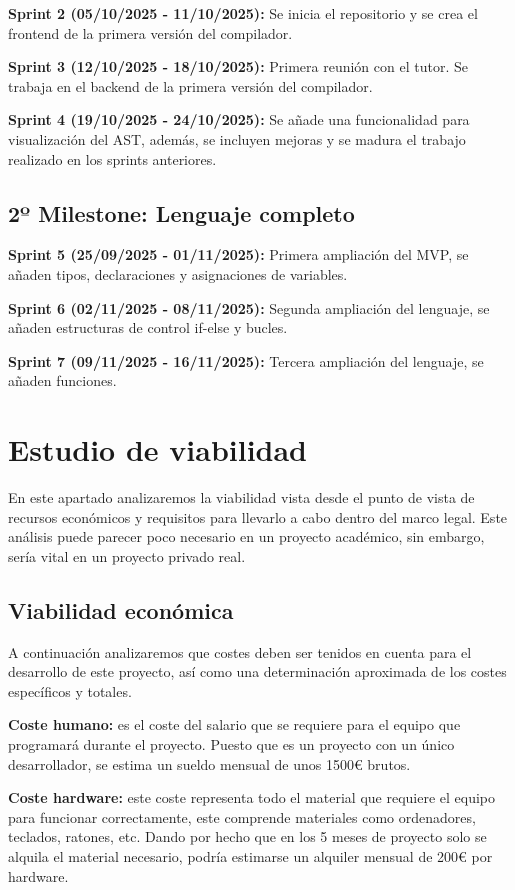 \textbf{Sprint 2 (05/10/2025 - 11/10/2025):} Se inicia el repositorio y se crea el frontend de la primera versión del compilador.

\textbf{Sprint 3 (12/10/2025 - 18/10/2025):} Primera reunión con el tutor. Se trabaja en el backend de la primera versión del compilador. 

\textbf{Sprint 4 (19/10/2025 - 24/10/2025):} Se añade una funcionalidad para visualización del AST, además, se incluyen mejoras y se madura el trabajo realizado en los sprints anteriores.   

\subsection{2º Milestone: Lenguaje completo}

\textbf{Sprint 5 (25/09/2025 - 01/11/2025):} Primera ampliación del MVP, se añaden tipos, declaraciones y asignaciones de variables.

\textbf{Sprint 6 (02/11/2025 - 08/11/2025):} Segunda ampliación del lenguaje, se añaden estructuras de control if-else y bucles.

\textbf{Sprint 7 (09/11/2025 - 16/11/2025):} Tercera ampliación del lenguaje, se añaden funciones. 

\section{Estudio de viabilidad}
En este apartado analizaremos la viabilidad vista desde el punto de vista de recursos económicos y requisitos para llevarlo a cabo dentro del marco legal. Este análisis puede parecer poco necesario en un proyecto académico, sin embargo, sería vital en un proyecto privado real.

\subsection{Viabilidad económica}
A continuación analizaremos que costes deben ser tenidos en cuenta para el desarrollo de este proyecto, así como una determinación aproximada de los costes específicos y totales.

\textbf{Coste humano:} es el coste del salario que se requiere para el equipo que programará durante el proyecto. Puesto que es un proyecto con un único desarrollador, se estima un sueldo mensual de unos 1500€ brutos.

\textbf{Coste hardware:} este coste representa todo el material que requiere el equipo para funcionar correctamente, este comprende materiales como ordenadores, teclados, ratones, etc. Dando por hecho que en los 5 meses de proyecto solo se alquila el material necesario, podría estimarse un alquiler mensual de 200€ por hardware.

